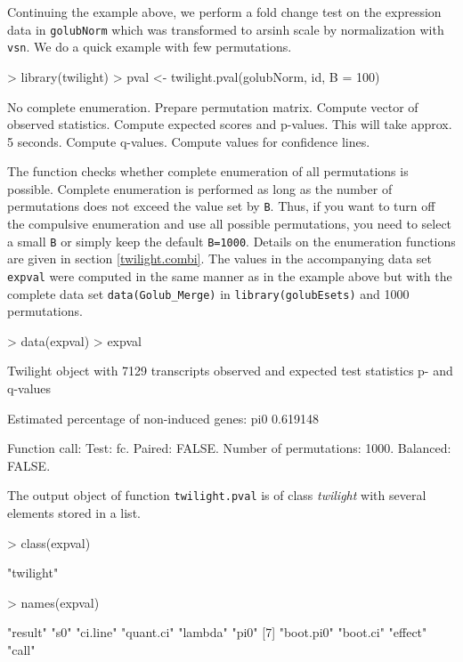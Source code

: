 \documentclass[11pt,a4paper,fleqn]{report}
\newcommand{\Robject}[1]{{\texttt{#1}}}
\newcommand{\Rfunction}[1]{{\texttt{#1}}}
\newcommand{\Rclass}[1]{{\textit{#1}}}
\newcommand{\Rfunarg}[1]{{\texttt{#1}}}
\begin{document}
Continuing the example above, we perform a fold change test on the expression data in \Robject{golubNorm} which was transformed to arsinh scale by normalization with \Rfunction{vsn}. We do a quick example with few permutations.
\begin{Schunk}
\begin{Sinput}
> library(twilight)
> pval <- twilight.pval(golubNorm, id, B = 100)
\end{Sinput}
\begin{Soutput}
No complete enumeration. Prepare permutation matrix. 
Compute vector of observed statistics. 
Compute expected scores and p-values. This will take approx. 5 seconds. 
Compute q-values. 
Compute values for confidence lines. 
\end{Soutput}
\end{Schunk}

The function checks whether complete enumeration of all permutations is possible. Complete enumeration is performed as long as the number of permutations does not exceed the value set by \Rfunarg{B}. Thus, if you want to turn off the compulsive enumeration and use all possible permutations, you need to select a small \Rfunarg{B} or simply keep the default \Rfunarg{B=1000}. Details on the enumeration functions are given in section \ref{twilight.combi}.
The values in the accompanying data set \Robject{expval} were computed in the same manner as in the example above but with the complete data set \Rfunction{data(Golub\_Merge)} in \Rfunction{library(golubEsets)} and 1000 permutations.
\begin{Schunk}
\begin{Sinput}
> data(expval)
> expval
\end{Sinput}
\begin{Soutput}
 Twilight object with
     7129 transcripts
     observed and expected test statistics
     p- and q-values

 Estimated percentage of non-induced genes:
     pi0 
0.619148 

 Function call:
 Test: fc. Paired: FALSE. Number of permutations: 1000. Balanced: FALSE. 
\end{Soutput}
\end{Schunk}

The output object of function \Rfunction{twilight.pval} is of class \Rclass{twilight} with several elements stored in a list.
\begin{Schunk}
\begin{Sinput}
> class(expval)
\end{Sinput}
\begin{Soutput}
[1] "twilight"
\end{Soutput}
\begin{Sinput}
> names(expval)
\end{Sinput}
\begin{Soutput}
 [1] "result"   "s0"       "ci.line"  "quant.ci" "lambda"   "pi0"     
 [7] "boot.pi0" "boot.ci"  "effect"   "call"    
\end{Soutput}
\end{Schunk}
\end{document}
